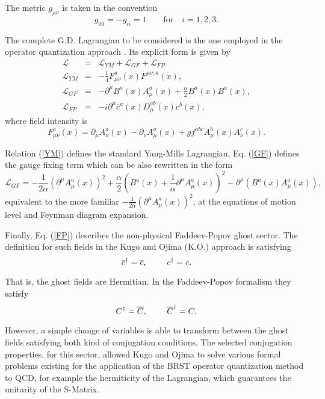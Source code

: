 \documentclass[12pt,letterpaper]{report}
\begin{document}
The metric $g_{\mu \nu }$ is taken in the convention
\[
g_{00}=-g_{ii}=1\qquad \text{for}\quad i=1,2,3.
\]

The complete G.D. Lagrangian to be considered is the one employed
in the operator quantization approach \cite{OjimaTex}. Its
explicit form is given by
\begin{eqnarray}
\mathcal{L} &=&\mathcal{L}_{YM}+\mathcal{L}_{GF}+\mathcal{L}_{FP}
\label{Lag} \\ \mathcal{L}_{YM} &=&-\frac 14F_{\mu \nu }^a\left(
x\right) F^{\mu \nu,a}\left(x\right), \label{YM} \\
\mathcal{L}_{GF} &=&-\partial ^\mu B^a\left(x\right) A_\mu
^a\left(x\right) +\frac \alpha 2B^a\left(x\right) B^a\left(
x\right), \label{GF} \\ \mathcal{L}_{FP} &=&-i\partial ^\mu
\overline{c}^a\left(x\right) D_\mu ^{ab}\left(x\right) c^b\left(
x\right), \label{FP}
\end{eqnarray}
where field intensity is
\[
F_{\mu \nu }^a\left(x\right) =\partial _\mu A_\nu ^a\left(
x\right) -\partial _\nu A_\mu ^a\left(x\right) +gf^{abc}A_\mu
^b\left(x\right) A_\nu ^c\left(x\right).
\]

Relation (\ref{YM}) defines the standard Yang-Mills Lagrangian,
Eq. (\ref{GF}) defines the gauge fixing term which can be also
rewritten in the form
\[
\mathcal{L}_{GF}=-\frac 1{2\alpha }\left(\partial ^\mu A_\mu
^a\left(x\right) \right) ^2+\frac \alpha 2\left(B^a\left(x\right)
+\frac 1\alpha
\partial ^\mu A_\mu ^a\left(x\right) \right) ^2-\partial ^\mu \left(
B^a\left(x\right) A_\mu ^a\left(x\right) \right),
\]
equivalent to the more familiar $-\frac 1{2\alpha }\left(\partial
^\mu A_\mu ^a\left(x\right) \right) ^2$, at the equations of
motion level \cite{Faddeev} and Feynman diagram expansion.

Finally, Eq. (\ref{FP}) describes the non-physical Faddeev-Popov
ghost sector. The definition for such fields in the Kugo and Ojima
(K.O.) approach is satisfying
\[
\overline{c}^{\dagger }=\overline{c},\text{ \qquad }c^{\dagger
}=c.
\]

That is, the ghost fields are Hermitian. In the Faddeev-Popov
formalism \cite{Faddeev} they satisfy
\[
C^{\dagger }=\overline{C},\text{ \qquad }\overline{C}^{\dagger
}=C.
\]

However, a simple change of variables is able to transform between
the ghost fields satisfying both kind of conjugation conditions.
The selected conjugation properties, for this sector, allowed Kugo
and Ojima to solve various formal problems existing for the
application of the BRST operator quantization method to QCD, for
example the hermiticity of the Lagrangian, which guarantees the
unitarity of the S-Matrix.
\end{document}
